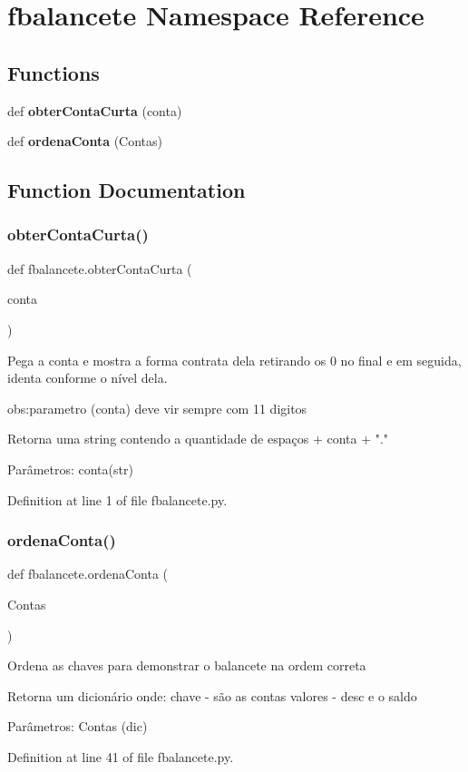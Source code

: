 \section{fbalancete Namespace Reference}
\label{namespacefbalancete}
\subsection*{Functions}
\begin{DoxyCompactItemize}
\item 
def \textbf{ obter\+Conta\+Curta} (conta)
\item 
def \textbf{ ordena\+Conta} (Contas)
\end{DoxyCompactItemize}


\subsection{Function Documentation}
\mbox{\label{namespacefbalancete_a2dbb38877ba1650cb7dff90909edd07e}} 
\subsubsection{obterContaCurta()}
{\footnotesize\ttfamily def fbalancete.\+obter\+Conta\+Curta (\begin{DoxyParamCaption}\item[{}]{conta }\end{DoxyParamCaption})}

\begin{DoxyVerb}Pega a conta e mostra a forma contrata dela retirando os 0 no final e em seguida,
identa conforme o nível dela.


obs:parametro (conta) deve vir sempre com 11 digitos

Retorna uma string contendo a quantidade de espaços + conta + "."

Parâmetros:
conta(str)\end{DoxyVerb}
 

Definition at line 1 of file fbalancete.\+py.

\mbox{\label{namespacefbalancete_a66898b5bc39f2eb8d81efd82c9c7635b}} 
\subsubsection{ordenaConta()}
{\footnotesize\ttfamily def fbalancete.\+ordena\+Conta (\begin{DoxyParamCaption}\item[{}]{Contas }\end{DoxyParamCaption})}

\begin{DoxyVerb}Ordena as chaves para demonstrar o balancete na ordem correta

Retorna um dicionário onde:
chave - são as contas
valores - desc e o saldo

Parâmetros:
Contas (dic)
\end{DoxyVerb}
 

Definition at line 41 of file fbalancete.\+py.

